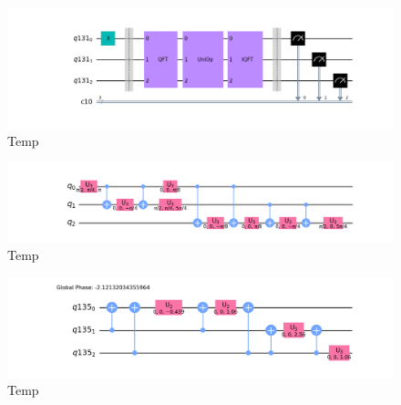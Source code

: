 \documentclass[../../dissertation.tex]{subfiles}
\begin{document}
\begin{figure}[!h]
	\centering
	\includegraphics[scale=0.35]{img/Qiskit/ContQuantumWalk/Circuits/circContQW_N3_S1.png}
	\caption{Temp} 
	\label{fig:contQWCircuitQistkit}
\end{figure}

\begin{figure}[!h]
	\centering
	\includegraphics[scale=0.40]{img/Qiskit/ContQuantumWalk/Circuits/circQft_N3_S1.png}
	\caption{Temp} 
	\label{fig:qftCircuitQistkit}
\end{figure}
\begin{figure}[!h]
	\centering
	\includegraphics[scale=0.40]{img/Qiskit/ContQuantumWalk/Circuits/circDiag_N3_S1.png}
	\caption{Temp} 
	\label{fig:diagCircuitQistkit}
\end{figure}
\end{document}
